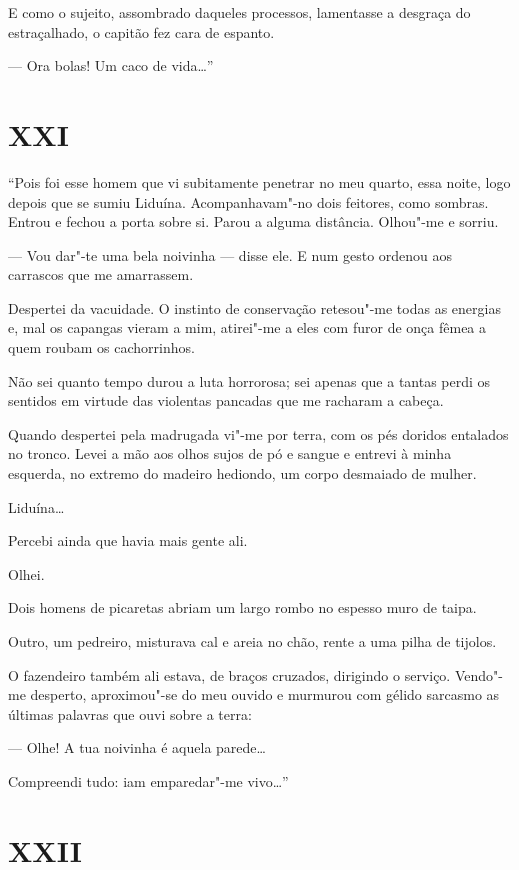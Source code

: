 E como o sujeito, assombrado daqueles processos, lamentasse a desgraça
do estraçalhado, o capitão fez cara de espanto.

--- Ora bolas! Um caco de vida\ldots{}''

\section*{XXI}

``Pois foi esse homem que vi subitamente penetrar no meu quarto, essa
noite, logo depois que se sumiu Liduína. Acompanhavam"-no dois feitores,
como sombras. Entrou e fechou a porta sobre si. Parou a alguma
distância. Olhou"-me e sorriu.

--- Vou dar"-te uma bela noivinha --- disse ele. E num gesto ordenou aos
carrascos que me amarrassem.

Despertei da vacuidade. O instinto de conservação retesou"-me todas as
energias e, mal os capangas vieram a mim, atirei"-me a eles com furor de
onça fêmea a quem roubam os cachorrinhos.

Não sei quanto tempo durou a luta horrorosa; sei apenas que a tantas
perdi os sentidos em virtude das violentas pancadas que me racharam a
cabeça.

Quando despertei pela madrugada vi"-me por terra, com os pés doridos
entalados no tronco. Levei a mão aos olhos sujos de pó e sangue e
entrevi à minha esquerda, no extremo do madeiro hediondo, um corpo
desmaiado de mulher.

Liduína\ldots{}

Percebi ainda que havia mais gente ali.

Olhei.

Dois homens de picaretas abriam um largo rombo no espesso muro de taipa.

Outro, um pedreiro, misturava cal e areia no chão, rente a uma pilha de
tijolos.

O fazendeiro também ali estava, de braços cruzados, dirigindo o serviço.
Vendo"-me desperto, aproximou"-se do meu ouvido e murmurou com gélido
sarcasmo as últimas palavras que ouvi sobre a terra:

--- Olhe! A tua noivinha é aquela parede\ldots{}

Compreendi tudo: iam emparedar"-me vivo\ldots{}''

\section*{XXII}

